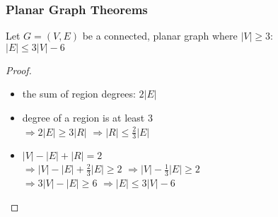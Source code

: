 \documentclass[dvipsnames]{beamer}
\begin{document}
% 

\begin{frame}
  \frametitle{Planar Graph Theorems}

  \begin{theorem}
    Let $G=(V,E)$ be a connected, planar graph where $|V| \geq 3$:\\
    $|E| \leq 3 |V| - 6$
  \end{theorem}

  \pause
  \begin{proof}
    \begin{itemize}
      \item the sum of region degrees: $2 |E|$

      \pause
      \item degree of a region is at least $3$\\
        \pause
        $\Rightarrow 2 |E| \geq 3 |R|$
        \pause
        $\Rightarrow |R| \leq \frac{2}{3} |E|$

      \pause
      \item $|V| - |E| + |R| = 2$\\
        \pause
        $\Rightarrow |V| - |E| + \frac{2}{3} |E| \geq 2$
        \pause
        $\Rightarrow |V| - \frac{1}{3} |E| \geq 2$\\
        \pause
        $\Rightarrow 3 |V| - |E| \geq 6$
        \pause
        $\Rightarrow |E| \leq 3 |V| - 6$\\
    \end{itemize}
  \end{proof}
\end{frame}
\end{document}
